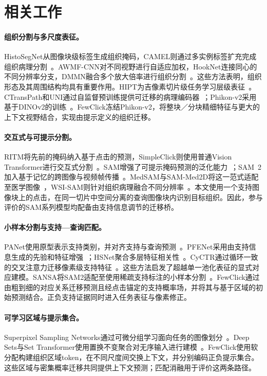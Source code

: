 \section{相关工作}
\paragraph{组织分割与多尺度表征。}
HistoSegNet从图像块级标签生成组织掩码，CAMEL则通过多实例标签扩充完成组织病理分割~\cite{chan2019histosegnet,xu2019camel}。AWMF-CNN对不同视野进行自适应加权，HookNet连接同心的不同分辨率分支，DMMN融合多个放大倍率进行组织分割~\cite{tokunaga2019awmf,vanrijthoven2021hooknet,ho2021dmmn}。这些方法表明，组织形态及其周围结构均具有重要作用。HIPT为吉像素切片级任务学习层级表征~\cite{chen2022hipt}。CTransPath和UNI通过自监督预训练提供可迁移的病理编码器~\cite{wang2022ctranspath,chen2024uni}；Phikon-v2采用基于DINOv2的训练~\cite{filiot2024phikon,oquab2024dinov2}。FewClick冻结Phikon-v2，将整块／分块精细特征与更大的上下文视野结合，实现由提示定义的组织迁移。

\paragraph{交互式与可提示分割。}
RITM将先前的掩码纳入基于点击的预测，SimpleClick则使用普通Vision Transformer进行交互式分割~\cite{sofiiuk2022ritm,liu2023simpleclick}。SAM增强了可提示掩码预测的泛化能力~\cite{kirillov2023sam}；SAM~2加入基于记忆的跨图像与视频帧传播~\cite{ravi2024sam2}。MedSAM与SAM-Med2D将这一范式适配至医学图像~\cite{ma2024medsam,cheng2023sammed2d}，WSI-SAM则针对组织病理融合不同分辨率~\cite{liu2024wsisam}。本文使用一个支持图像块上的点击，在同一切片中空间分离的查询图像块内识别目标组织。因此，参与评价的SAM系列模型均配备由支持信息调节的迁移桥。

\paragraph{小样本分割与支持—查询匹配。}
PANet使用原型表示支持类别，并对齐支持与查询预测~\cite{wang2019panet}。PFENet采用由支持信息生成的先验和特征增强~\cite{tian2022pfenet}；HSNet聚合多层特征相关性~\cite{min2021hsnet}。CyCTR通过循环一致的交叉注意力迁移像素级支持特征~\cite{zhang2021cyctr}。这些方法启发了超越单一池化表征的显式对应建模。SANSA将SAM2适配至使用稀疏支持标注的小样本分割~\cite{cuttano2025sansa}。FewClick通过由粗到细的对应关系迁移预测且经点击锚定的支持概率场，并将其与基于区域的初始预测结合。正负支持证据同时进入任务表征与像素修正。

\paragraph{可学习区域与提示集合。}
Superpixel Sampling Networks通过可微分组学习面向任务的图像划分~\cite{jampani2018ssn}。Deep Sets与Set Transformer使用置换不变聚合对无序输入进行建模~\cite{zaheer2017deepsets,lee2019settransformer}。FewClick使用软分配构建组织区域token，在不同尺度间交换上下文，并分别编码正负提示集合。这些区域与密集概率迁移共同提供上下文预测；匹配消融用于评价这两条路径。
